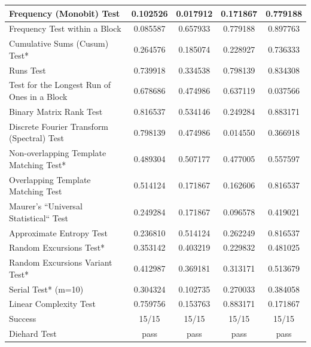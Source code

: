 \begin{table}[t]
\begin{tabular}{|l@{}||c@{}|c@{}|c@{}|c@{}|}
Frequency (Monobit) Test            &  0.102526 &  0.017912 &  0.171867 &  0.779188  \\ \hline
Frequency Test within a Block             &  0.085587 &  0.657933 &  0.779188 &  0.897763  \\ \hline
Cumulative Sums (Cusum) Test*             &  0.264576 &  0.185074 &  0.228927 &  0.736333 \\ \hline
Runs Test                    &  0.739918 &  0.334538 &  0.798139 &  0.834308  \\ \hline
Test for the Longest Run of Ones in a Block     &  0.678686 &  0.474986 &  0.637119 &  0.037566  \\ \hline
Binary Matrix Rank Test                & 0.816537 &  0.534146 &  0.249284 &  0.883171  \\ \hline
Discrete Fourier Transform (Spectral) Test     &   0.798139 &  0.474986 &  0.014550 &  0.366918  \\ \hline
Non-overlapping Template Matching Test*        &  0.489304 &  0.507177 &  0.477005 &  0.557597  \\ \hline
Overlapping Template Matching Test        &  0.514124 &  0.171867 &  0.162606 &  0.816537 \\ \hline
Maurer's ``Universal Statistical`` Test         &   0.249284 &  0.171867 &  0.096578 &  0.419021 \\ \hline
Approximate Entropy Test             & 0.236810 &  0.514124 &  0.262249 &  0.816537 \\ \hline
Random Excursions Test*                &  0.353142 &  0.403219 &  0.229832 &  0.481025 \\ \hline
Random Excursions Variant Test*            &  0.412987 &  0.369181 &  0.313171 &  0.513679  \\ \hline
Serial Test* (m=10)                &  0.304324 &  0.102735 &  0.270033 &  0.384058 \\ \hline
Linear Complexity Test                &0.759756 &  0.153763 &  0.883171 &  0.171867 \\ \hline
Success                     &15/15&15/15&15/15&15/15  \\ \hline\hline
Diehard Test               &pass&pass&pass&pass\\ \hline
  \end{tabular}
\end{table}

